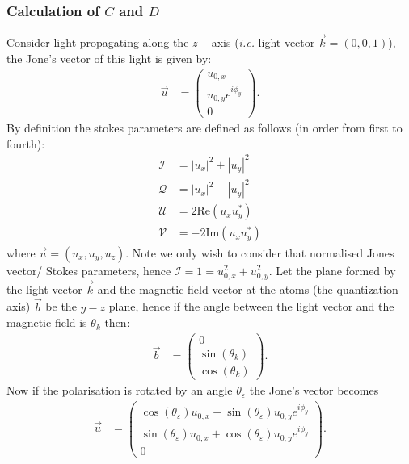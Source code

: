 \subsubsection*{Calculation of \(C\) and \(D\)}
	Consider light propagating along the \(z-\)axis (\textit{i.e.} light vector \(\vec{k} = \left(0,0,1\right)\)), the Jone's vector of this light is given by:
	\begin{align}
	    \vec{u} &= \begin{pmatrix}
	    u_{0,x} \\
	    u_{0,y} e^{i \phi_y} \\
	    0
	\end{pmatrix}.
	\end{align}
	By definition the stokes parameters are defined as follows (in order from first to fourth):
	\begin{align}
	    \mathcal{I} &= |u_x|^2 + |u_y|^2 \\ 
	    \mathcal{Q} &= |u_x|^2 - |u_y|^2 \\
	    \mathcal{U} &= 2 \text{Re} \left(u_x u_y^*\right) \\
	    \mathcal{V} &= -2 \text{Im}\left(u_x u_y^*\right)
	\end{align}
	where \(\vec{u} = (u_x,u_y,u_z)\). Note we only wish to consider that normalised Jones vector/ Stokes parameters, hence \(\mathcal{I}=1=u_{0,x}^2+u_{0,y}^2\). Let the plane formed by the light vector \(\vec{k}\) and the magnetic field vector at the atoms (the quantization axis) \(\vec{b}\) be the \(y-z\) plane, hence if the angle between the light vector and the magnetic field is \(\theta_k\) then:
	\begin{align}
	        \vec{b} &= \begin{pmatrix}
	    0 \\
	    \sin(\theta_k) \\
	    \cos(\theta_k)
	\end{pmatrix}.
	\end{align}
	Now if the polarisation is rotated by an angle \(\theta_\varepsilon\) the Jone's vector becomes 
	\begin{align}
	    \vec{u} &= \begin{pmatrix}
	    \cos(\theta_\varepsilon) u_{0,x} -\sin(\theta_\varepsilon) u_{0,y} e^{i \phi_y}\\
	    \sin(\theta_\varepsilon) u_{0,x} +\cos(\theta_\varepsilon) u_{0,y} e^{i \phi_y} \\
	    0
	\end{pmatrix}.
	\end{align}

